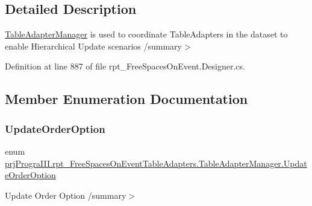 \subsection{Detailed Description}
\hyperlink{classprj_progra_i_i_i_1_1rpt___free_spaces_on_event_table_adapters_1_1_table_adapter_manager}{Table\+Adapter\+Manager} is used to coordinate Table\+Adapters in the dataset to enable Hierarchical Update scenarios /summary$>$ 

Definition at line 887 of file rpt\+\_\+\+Free\+Spaces\+On\+Event.\+Designer.\+cs.



\subsection{Member Enumeration Documentation}
\hypertarget{classprj_progra_i_i_i_1_1rpt___free_spaces_on_event_table_adapters_1_1_table_adapter_manager_a9cfd63ba078114fdb1994cfe5f0d2eeb}{}\label{classprj_progra_i_i_i_1_1rpt___free_spaces_on_event_table_adapters_1_1_table_adapter_manager_a9cfd63ba078114fdb1994cfe5f0d2eeb} 
\subsubsection{\texorpdfstring{Update\+Order\+Option}{UpdateOrderOption}}
{\footnotesize\ttfamily enum \hyperlink{classprj_progra_i_i_i_1_1rpt___free_spaces_on_event_table_adapters_1_1_table_adapter_manager_a9cfd63ba078114fdb1994cfe5f0d2eeb}{prj\+Progra\+I\+I\+I.\+rpt\+\_\+\+Free\+Spaces\+On\+Event\+Table\+Adapters.\+Table\+Adapter\+Manager.\+Update\+Order\+Option}\hspace{0.3cm}{\ttfamily [strong]}}



Update Order Option /summary$>$ 

